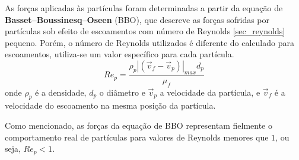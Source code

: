 As forças aplicadas às partículas foram determinadas a partir da equação de \textbf{Basset–Boussinesq–Oseen} (BBO), que descreve as forças sofridas por partículas sob efeito de escoamentos com número de Reynolds \ref{sec_reynolds} pequeno.
Porém, o número de Reynolds utilizados é diferente do calculado para escoamentos, utiliza-se um valor específico para cada partícula.
\begin{equation}
    Re_{p} = \dfrac{\rho_p |\left(\vec{v}_{f} - \vec{v}_{p} \right)|_{max} d_{p}}{\mu_f}
    \label{reynolds_p}
\end{equation}
onde $\rho_p$ é a densidade, $d_p$ o diâmetro e $\vec{v}_{p}$ a velocidade da partícula, e $\vec{v}_{f}$ é a velocidade do escoamento na mesma posição da partícula.

Como mencionado, as forças da equação de BBO representam fielmente o comportamento real de partículas para valores de Reynolds menores que $1$,  ou seja, $Re_{p} < 1$.

